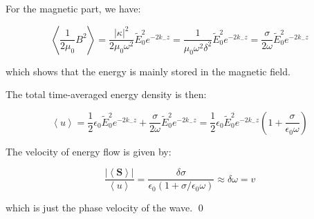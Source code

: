 \documentclass[12pt]{article}
\begin{document}
For the magnetic part, we have:

\begin{equation}
    \left\langle \frac{1}{2\mu_{0}} B^{2} \right\rangle = \frac{\left\lvert \kappa \right\rvert^{2}}{2\mu_{0} \omega^{2}} \tilde{E}_{0}^{2} e^{-2k_{-} z} = \frac{1}{\mu_{0} \omega^{2} \delta^{2}} \tilde{E}_{0}^{2} e^{-2k_{-} z} = \frac{\sigma}{2\omega} \tilde{E}_{0}^{2} e^{-2k_{-} z}
\end{equation}

which shows that the energy is mainly stored in the magnetic field.

The total time-averaged energy density is then:

\begin{equation}
    \left\langle u \right\rangle = \frac{1}{2} \epsilon_{0} \tilde{E}_{0}^{2} e^{-2k_{-} z} + \frac{\sigma}{2\omega} \tilde{E}_{0}^{2} e^{-2k_{-} z} = \frac{1}{2} \epsilon_{0} \tilde{E}_{0}^{2} e^{-2k_{-} z} \left( 1 + \frac{\sigma}{\epsilon_{0} \omega} \right)
\end{equation}

The velocity of energy flow is given by:

\begin{equation}
    \frac{\left\lvert \left\langle \mathbf{S} \right\rangle \right\rvert}{\left\langle u \right\rangle} = \frac{\delta \sigma}{\epsilon_{0} (1 + \sigma/\epsilon_{0} \omega)} \approx \delta \omega = v
\end{equation}

which is just the phase velocity of the wave.
\qed
\end{document}
